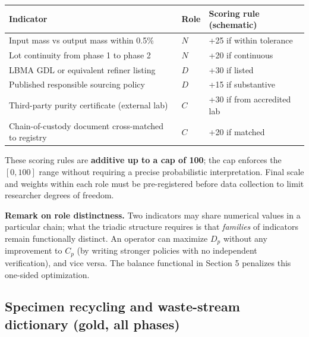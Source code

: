 \documentclass[12pt]{article}
\begin{document}
\begin{longtable}[]{@{}
  >{\raggedright\arraybackslash}p{}
  >{\raggedright\arraybackslash}p{}
  >{\raggedright\arraybackslash}p{}@{}}
\toprule\noalign{}
\begin{minipage}[b]{\linewidth}\raggedright
Indicator
\end{minipage} & \begin{minipage}[b]{\linewidth}\raggedright
Role
\end{minipage} & \begin{minipage}[b]{\linewidth}\raggedright
Scoring rule (schematic)
\end{minipage} \\
\midrule\noalign{}
\endhead
\bottomrule\noalign{}
\endlastfoot
Input mass vs output mass within 0.5\% & \(N\) & +25 if within
tolerance \\
Lot continuity from phase 1 to phase 2 & \(N\) & +20 if continuous \\
LBMA GDL or equivalent refiner listing & \(D\) & +30 if listed \\
Published responsible sourcing policy & \(D\) & +15 if substantive \\
Third-party purity certificate (external lab) & \(C\) & +30 if from
accredited lab \\
Chain-of-custody document cross-matched to registry & \(C\) & +20 if
matched \\
\end{longtable}

These scoring rules are \textbf{additive up to a cap of 100}; the cap
enforces the \([0,100]\) range without requiring a precise probabilistic
interpretation. Final scale and weights within each role must be
pre-registered before data collection to limit researcher degrees of
freedom.

\textbf{Remark on role distinctness.} Two indicators may share numerical
values in a particular chain; what the triadic structure requires is
that \emph{families} of indicators remain functionally distinct. An
operator can maximize \(D_p\) without any improvement to \(C_p\) (by
writing stronger policies with no independent verification), and vice
versa. The balance functional in Section 5 penalizes this one-sided
optimization.

\subsection{Specimen recycling and waste-stream dictionary (gold, all phases)}\label{specimen-recycling-and-waste-stream-dictionary-gold-all-phases}
\end{document}
